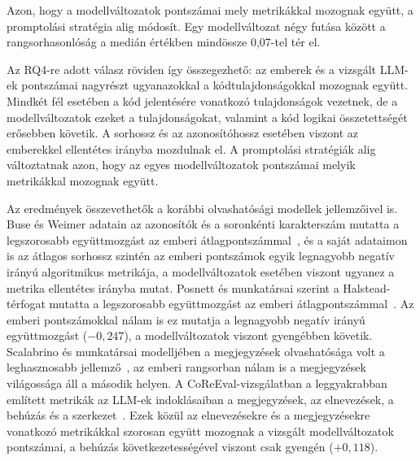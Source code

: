 \documentclass[
]{elteikthesis}[2024/04/26]
\begin{document}
Azon, hogy a modellváltozatok pontszámai mely metrikákkal mozognak együtt, a promptolási stratégia alig módosít.
Egy modellváltozat négy futása között a rangsorhasonlóság a medián értékben mindössze 0,07-tel tér el.

Az RQ4-re adott válasz röviden így összegezhető:
az emberek és a vizsgált LLM-ek pontszámai nagyrészt ugyanazokkal a kódtulajdonságokkal mozognak együtt.
Mindkét fél esetében a kód jelentésére vonatkozó tulajdonságok vezetnek,
de a modellváltozatok ezeket a tulajdonságokat,
valamint a kód logikai összetettségét erősebben követik.
A sorhossz és az azonosítóhossz esetében viszont az emberekkel ellentétes irányba mozdulnak el.
A promptolási stratégiák alig változtatnak azon, hogy az egyes modellváltozatok
pontszámai melyik metrikákkal mozognak együtt.

Az eredmények összevethetők a korábbi olvashatósági modellek jellemzőivel is.
Buse és Weimer adatain az azonosítók és a soronkénti karakterszám mutatta a legszorosabb
együttmozgást az emberi átlagpontszámmal~\cite{buse2010learning},
és a saját adataimon is az átlagos sorhossz szintén az emberi pontszámok egyik legnagyobb negatív irányú
algoritmikus metrikája, a modellváltozatok esetében viszont ugyanez a metrika ellentétes irányba mutat.
Posnett és munkatársai szerint a Halstead-térfogat mutatta a
legszorosabb együttmozgást az emberi átlagpontszámmal~\cite{posnett2011simpler}.
Az emberi pontszámokkal nálam is ez mutatja a legnagyobb negatív irányú együttmozgást ($-0{,}247$),
a modellváltozatok viszont gyengébben követik.
Scalabrino és munkatársai modelljében a megjegyzések olvashatósága volt a leghasznosabb
jellemző~\cite{scalabrino2018comprehensive}, az emberi rangsorban nálam is a megjegyzések
világossága áll a második helyen.
A CoReEval-vizsgálatban a leggyakrabban említett metrikák az LLM-ek indoklásaiban
a megjegyzések, az elnevezések, a behúzás és a szerkezet~\cite{ouedraogo2025coreeval}.
Ezek közül az elnevezésekre és a megjegyzésekre vonatkozó metrikákkal
szorosan együtt mozognak a vizsgált modellváltozatok pontszámai,
a behúzás következetességével viszont csak gyengén ($+0{,}118$).
\end{document}
